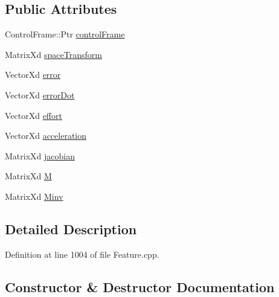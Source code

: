 \subsection*{Public Attributes}
\begin{DoxyCompactItemize}
\item 
Control\+Frame\+::\+Ptr \hyperlink{structocra_1_1ContactConstraintFeature_1_1Pimpl_a5494b44c1948a8ad255b266b216ab04f}{control\+Frame}
\item 
Matrix\+Xd \hyperlink{structocra_1_1ContactConstraintFeature_1_1Pimpl_a3b33ee6094ed308df598785b4a75416c}{space\+Transform}
\item 
Vector\+Xd \hyperlink{structocra_1_1ContactConstraintFeature_1_1Pimpl_a00ed1a9962ef8b48ed816d4f3f39394b}{error}
\item 
Vector\+Xd \hyperlink{structocra_1_1ContactConstraintFeature_1_1Pimpl_a43821a1f06ddd5af36588e84def45897}{error\+Dot}
\item 
Vector\+Xd \hyperlink{structocra_1_1ContactConstraintFeature_1_1Pimpl_af9482cf46b3e6e4e44c3244b63d899c5}{effort}
\item 
Vector\+Xd \hyperlink{structocra_1_1ContactConstraintFeature_1_1Pimpl_abbd60c31e91c03722e770e7a65890599}{acceleration}
\item 
Matrix\+Xd \hyperlink{structocra_1_1ContactConstraintFeature_1_1Pimpl_ab7a5dfed0b05f6871bad4fcf61d7e998}{jacobian}
\item 
Matrix\+Xd \hyperlink{structocra_1_1ContactConstraintFeature_1_1Pimpl_a2de0104acc90d7ef05e0b5d5c6142ed5}{M}
\item 
Matrix\+Xd \hyperlink{structocra_1_1ContactConstraintFeature_1_1Pimpl_afa7af0eb036037f47dfa1b93c02cd3d5}{Minv}
\end{DoxyCompactItemize}


\subsection{Detailed Description}


Definition at line 1004 of file Feature.\+cpp.



\subsection{Constructor \& Destructor Documentation}
